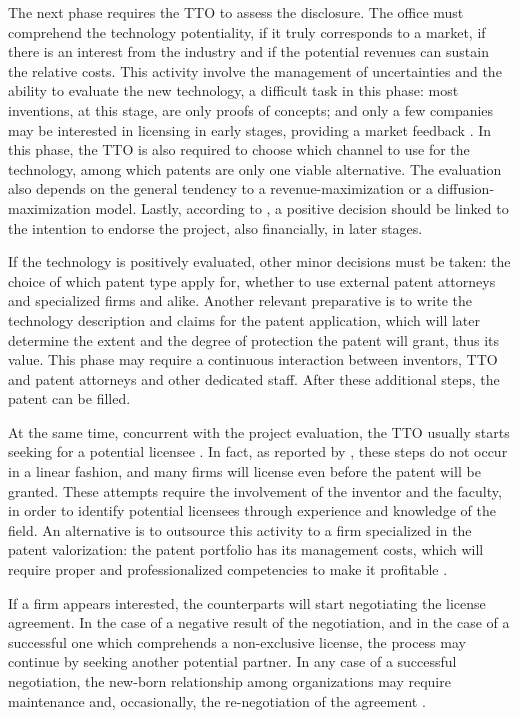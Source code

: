 The next phase requires the TTO to assess the disclosure. The office must comprehend the technology potentiality, if it truly corresponds to a market, if there is an interest from the industry and if the potential revenues can sustain the relative costs. This activity involve the management of uncertainties and the ability to evaluate the new technology, a difficult task in this phase: most inventions, at this stage, are only proofs of concepts; and only a few companies may be interested in licensing in early stages, providing a market feedback \citep{Jensen2003}. In this phase, the TTO is also required to choose which channel to use for the technology, among which patents are only one viable alternative. The evaluation also depends on the general tendency to a revenue-maximization or a diffusion-maximization model. Lastly, according to \citet{McAdam2005}, a positive decision should be linked to the intention to endorse the project, also financially, in later stages.

If the technology is positively evaluated, other minor decisions must be taken: the choice of which patent type apply for, whether to use external patent attorneys and specialized firms and alike. Another relevant preparative is to write the technology description and claims for the patent application, which will later determine the extent and the degree of protection the patent will grant, thus its value. This phase may require a continuous interaction between inventors, TTO and patent attorneys and other dedicated staff. After these additional steps, the patent can be filled.

At the same time, concurrent with the project evaluation, the TTO usually starts seeking for a potential licensee \citep{Markman2005}. In fact, as reported by \citet{Siegel2003a}, these steps do not occur in a linear fashion, and many firms will license even before the patent will be granted. These attempts require the involvement of the inventor and the faculty, in order to identify potential licensees through experience and knowledge of the field. An alternative is to outsource this activity to a firm specialized in the patent valorization: the patent portfolio has its management costs, which will require proper and professionalized competencies to make it profitable \citep{Balderi2010}. 

If a firm appears interested, the counterparts will start negotiating the license agreement. In the case of a negative result of the negotiation, and in the case of a successful one which comprehends a non-exclusive license, the process may continue by seeking another potential partner. In any case of a successful negotiation, the new-born relationship among organizations may require maintenance and, occasionally, the re-negotiation of the agreement \citep{Siegel2003a}. 

